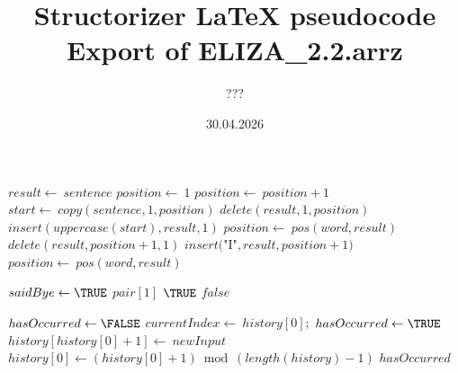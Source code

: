 \documentclass[a4paper,10pt]{article}
\title{Structorizer LaTeX pseudocode Export of ELIZA\_2.2.arrz}
\author{???}
\date{30.04.2026}
\begin{document}
\begin{algorithm}
\caption{adjustSpelling(sentence)}
\begin{algorithmic}[5]

\STATE {}
  \STATE \(result\gets\ sentence\)
  \STATE \(position\gets\ 1\)
    \STATE \(position\gets\ position+1\)
  \ENDWHILE
    \STATE \(start\gets\ copy(sentence,1,position)\)
    \STATE \(delete(result,1,position)\)
    \STATE \(insert(uppercase(start),result,1)\)
  \ENDIF
    \STATE \(position\gets\ pos(word,result)\)
      \STATE \(delete(result,position+1,1)\)
      \STATE \(insert(\)"{}I"{}\(,result,position+1)\)
      \STATE \(position\gets\ pos(word,result)\)
    \ENDWHILE
  \ENDFOR

\end{algorithmic}
\end{algorithm}


\begin{algorithm}
\caption{checkGoodBye(text, phrases)}
\begin{algorithmic}[5]

\STATE {}
\STATE {}
\STATE {}
\STATE {}
      \STATE \(saidBye\gets\TRUE\)
      \PRINT\(pair[1]\)
      \RETURN\(\TRUE\)
    \ENDIF
  \ENDFOR
  \RETURN\(false\)

\end{algorithmic}
\end{algorithm}


\begin{algorithm}
\caption{checkRepetition(history, newInput)}
\begin{algorithmic}[5]

\STATE {}
\STATE {}
  \STATE \(hasOccurred\gets\FALSE\)
    \STATE \(currentIndex\gets\ history[0];\)
        \STATE \(hasOccurred\gets\TRUE\)
      \ENDIF
    \ENDFOR
    \STATE \(history[history[0]+1]\gets\ newInput\)
    \STATE \(history[0]\gets(history[0]+1)\bmod(length(history)-1)\)
  \ENDIF
  \RETURN\(hasOccurred\)

\end{algorithmic}
\end{algorithm}
\end{document}
